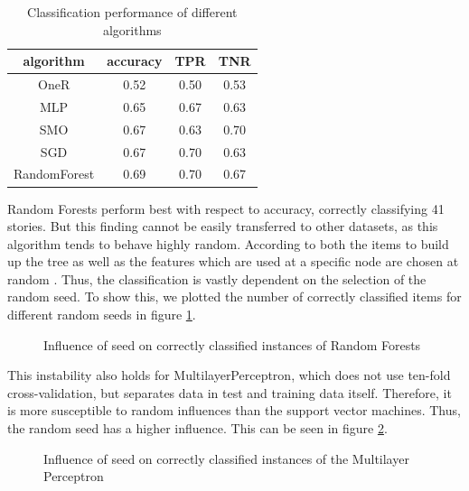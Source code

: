 \documentclass[letterpaper]{article}
\begin{document}
\begin{table}
\begin{tabular}{c|c|c|c}
algorithm & accuracy & TPR & TNR \\
\hline
OneR & 0.52 & 0.50 & 0.53 \\
\hline
MLP & 0.65 & 0.67 & 0.63  \\
\hline
SMO & 0.67 & 0.63 & 0.70 \\
\hline
SGD & 0.67 & 0.70 & 0.63 \\
\hline 
RandomForest & 0.69 & 0.70 & 0.67 \\
\end{tabular}
\caption{Classification performance of different algorithms}
\label{table:performance}
\end{table}

Random Forests perform best with respect to accuracy, correctly classifying 41 stories. But this finding cannot be easily transferred to other datasets, as this algorithm tends to behave highly random. According to \citeauthor{breiman2001random} both the items to build up the tree as well as the features which are used at a specific node are chosen at random \cite{breiman2001random}. Thus, the classification is vastly dependent on the selection of the random seed. To show this, we plotted the number of correctly classified items for different random seeds in figure \ref{figure:seedRF}. 

\begin{figure}[thpb]
      \centering
      \caption{Influence of seed on correctly classified instances of Random Forests}
      \label{figure:seedRF}
\end{figure}

This instability also holds for MultilayerPerceptron, which does not use ten-fold cross-validation, but separates data in test and training data itself. Therefore, it is more susceptible to random influences than the support vector machines. Thus, the random seed has a higher influence. This can be seen in figure \ref{figure:seedMLP}.

\begin{figure}[thpb]
      \centering
      \caption{Influence of seed on correctly classified instances of the Multilayer Perceptron}
      \label{figure:seedMLP}
\end{figure}
\end{document}
